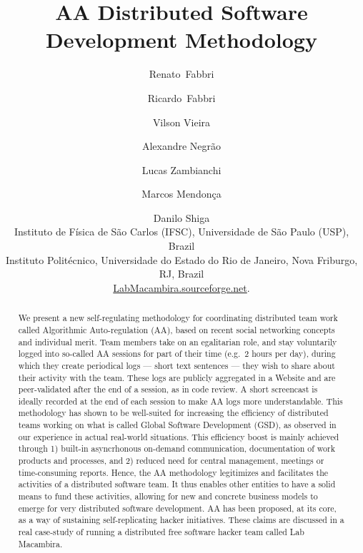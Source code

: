\title{
AA Distributed Software Development Methodology
}

\author{%
Renato~Fabbri \and Ricardo~Fabbri \and Vilson Vieira \and Alexandre Negr\~{a}o \and Lucas Zambianchi
\and Marcos Mendon\c{c}a \and Danilo Shiga\\[1em]
\small{
Instituto de F\'{i}sica de S\~{a}o Carlos (IFSC), Universidade de
S\~{a}o Paulo (USP), Brazil}\\[0.5em]
\small{Instituto Polit\'{e}cnico, Universidade do Estado do Rio de
Janeiro, Nova Friburgo, RJ, Brazil}\\[0.5em]
\url{LabMacambira.sourceforge.net}.
}


\maketitle

\begin{abstract}
We present a new self-regulating methodology for coordinating distributed team
work called Algorithmic Auto-regulation (AA), based on recent social networking
concepts and individual merit. Team members take on an egalitarian role, and
stay voluntarily logged into so-called AA sessions for part of their time (e.g.\
2 hours per day), during which they create periodical logs --- short text
sentences --- they wish to share about their activity with the team. These logs
are publicly aggregated in a Website and are peer-validated after the end of a
session, as in code review.  A short screencast is ideally recorded at the end
of each session to make AA logs more understandable.  This methodology has shown
to be well-suited for increasing the efficiency of distributed teams working on
what is called Global Software Development (GSD), as observed in our experience
in actual real-world situations.  This efficiency boost is mainly achieved through 1)
built-in asyncrhonous on-demand communication, documentation of work products
and processes, and 2) reduced need for central management, meetings or
time-consuming reports. Hence, the AA methodology legitimizes and facilitates
the activities of a distributed software team.  It thus enables other entities
to have a solid means to fund these activities, allowing for new and concrete
business models to emerge for very distributed software development. AA has been
proposed, at its core, as a way of sustaining self-replicating hacker
initiatives. These claims are discussed in a real case-study of running a
distributed free software hacker team called Lab Macambira.  
\end{abstract}

